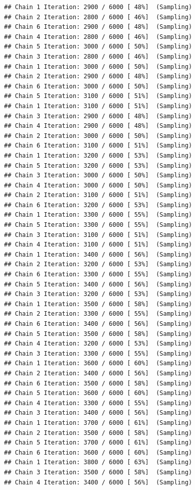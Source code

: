 \documentclass[
]{article}
\begin{document}
\begin{verbatim}
## Chain 1 Iteration: 2900 / 6000 [ 48%]  (Sampling) 
## Chain 2 Iteration: 2800 / 6000 [ 46%]  (Sampling) 
## Chain 6 Iteration: 2900 / 6000 [ 48%]  (Sampling) 
## Chain 4 Iteration: 2800 / 6000 [ 46%]  (Sampling) 
## Chain 5 Iteration: 3000 / 6000 [ 50%]  (Sampling) 
## Chain 3 Iteration: 2800 / 6000 [ 46%]  (Sampling) 
## Chain 1 Iteration: 3000 / 6000 [ 50%]  (Sampling) 
## Chain 2 Iteration: 2900 / 6000 [ 48%]  (Sampling) 
## Chain 6 Iteration: 3000 / 6000 [ 50%]  (Sampling) 
## Chain 5 Iteration: 3100 / 6000 [ 51%]  (Sampling) 
## Chain 1 Iteration: 3100 / 6000 [ 51%]  (Sampling) 
## Chain 3 Iteration: 2900 / 6000 [ 48%]  (Sampling) 
## Chain 4 Iteration: 2900 / 6000 [ 48%]  (Sampling) 
## Chain 2 Iteration: 3000 / 6000 [ 50%]  (Sampling) 
## Chain 6 Iteration: 3100 / 6000 [ 51%]  (Sampling) 
## Chain 1 Iteration: 3200 / 6000 [ 53%]  (Sampling) 
## Chain 5 Iteration: 3200 / 6000 [ 53%]  (Sampling) 
## Chain 3 Iteration: 3000 / 6000 [ 50%]  (Sampling) 
## Chain 4 Iteration: 3000 / 6000 [ 50%]  (Sampling) 
## Chain 2 Iteration: 3100 / 6000 [ 51%]  (Sampling) 
## Chain 6 Iteration: 3200 / 6000 [ 53%]  (Sampling) 
## Chain 1 Iteration: 3300 / 6000 [ 55%]  (Sampling) 
## Chain 5 Iteration: 3300 / 6000 [ 55%]  (Sampling) 
## Chain 3 Iteration: 3100 / 6000 [ 51%]  (Sampling) 
## Chain 4 Iteration: 3100 / 6000 [ 51%]  (Sampling) 
## Chain 1 Iteration: 3400 / 6000 [ 56%]  (Sampling) 
## Chain 2 Iteration: 3200 / 6000 [ 53%]  (Sampling) 
## Chain 6 Iteration: 3300 / 6000 [ 55%]  (Sampling) 
## Chain 5 Iteration: 3400 / 6000 [ 56%]  (Sampling) 
## Chain 3 Iteration: 3200 / 6000 [ 53%]  (Sampling) 
## Chain 1 Iteration: 3500 / 6000 [ 58%]  (Sampling) 
## Chain 2 Iteration: 3300 / 6000 [ 55%]  (Sampling) 
## Chain 6 Iteration: 3400 / 6000 [ 56%]  (Sampling) 
## Chain 5 Iteration: 3500 / 6000 [ 58%]  (Sampling) 
## Chain 4 Iteration: 3200 / 6000 [ 53%]  (Sampling) 
## Chain 3 Iteration: 3300 / 6000 [ 55%]  (Sampling) 
## Chain 1 Iteration: 3600 / 6000 [ 60%]  (Sampling) 
## Chain 2 Iteration: 3400 / 6000 [ 56%]  (Sampling) 
## Chain 6 Iteration: 3500 / 6000 [ 58%]  (Sampling) 
## Chain 5 Iteration: 3600 / 6000 [ 60%]  (Sampling) 
## Chain 4 Iteration: 3300 / 6000 [ 55%]  (Sampling) 
## Chain 3 Iteration: 3400 / 6000 [ 56%]  (Sampling) 
## Chain 1 Iteration: 3700 / 6000 [ 61%]  (Sampling) 
## Chain 2 Iteration: 3500 / 6000 [ 58%]  (Sampling) 
## Chain 5 Iteration: 3700 / 6000 [ 61%]  (Sampling) 
## Chain 6 Iteration: 3600 / 6000 [ 60%]  (Sampling) 
## Chain 1 Iteration: 3800 / 6000 [ 63%]  (Sampling) 
## Chain 3 Iteration: 3500 / 6000 [ 58%]  (Sampling) 
## Chain 4 Iteration: 3400 / 6000 [ 56%]  (Sampling) 

\end{verbatim}
\end{document}
